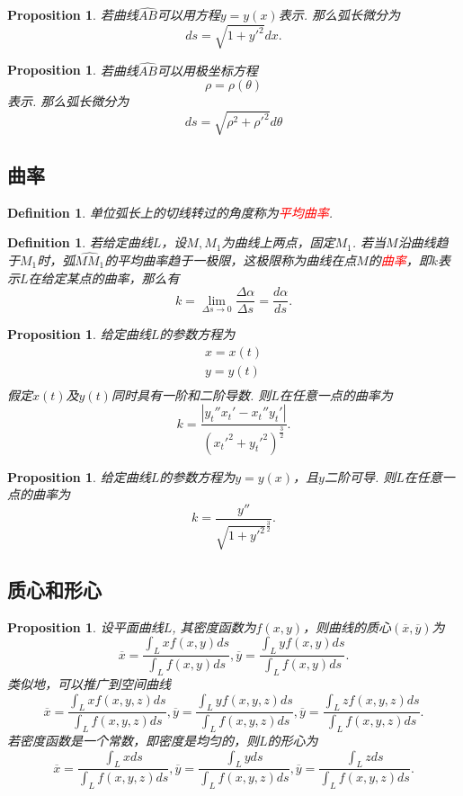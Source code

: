 \documentclass{article}
\newtheorem{proposition}[theorem]{Proposition}
\newtheorem{definition}[theorem]{Definition}
\newcommand{\redt}[1]{\textcolor{red}{#1}}
\begin{document}
\begin{proposition}
\rm  若曲线$\widehat{AB}$可以用方程$y=y(x)$表示. 那么弧长微分为
$$
ds = \sqrt{1+y'^2} dx. 
$$
\end{proposition}

\begin{proposition}
\rm 若曲线$\widehat{AB}$可以用极坐标方程
$$
\rho = \rho(\theta)
$$
表示. 那么弧长微分为
$$
ds = \sqrt{\rho^2+\rho'^2}d\theta
$$
\end{proposition}

\subsection{曲率}

\begin{definition}
\rm 单位弧长上的切线转过的角度称为\redt{平均曲率}. 
\end{definition}

\begin{definition}
\rm 若给定曲线$L$，设$M,M_1$为曲线上两点，固定$M_1$. 若当$M$沿曲线趋于$M_1$时，弧$\widehat{MM_1}$的平均曲率趋于一极限，这极限称为曲线在点$M$的\redt{曲率}，即$k$表示$L$在给定某点的曲率，那么有
$$
k =  \lim\limits_{\Delta s \to 0} \frac{\Delta \alpha}{\Delta s} = \frac{d\alpha}{ds}.
$$ 
\end{definition}

\begin{proposition}
\rm 给定曲线$L$的参数方程为
$$
\begin{array}{ll}
x = x(t) \\
y = y(t) \\
\end{array}
$$
假定$x(t)$及$y(t)$同时具有一阶和二阶导数. 则$L$在任意一点的曲率为
$$
k = \frac{|y_t''x_t'-x_t''y_t'|}{(x_t'^2 + y_t'^2)^{\frac{3}{2}}}.
$$
\end{proposition}

\begin{proposition}
\rm 给定曲线$L$的参数方程为$y=y(x)$，且$y$二阶可导. 则$L$在任意一点的曲率为
$$
k = \frac{y''}{\sqrt{1+y'^2}^{\frac{3}{2}}}.
$$
\end{proposition}


\subsection{质心和形心}

\begin{proposition}
\rm 设平面曲线$L$, 其密度函数为$f(x,y)$，则曲线的质心$(\overline{x},\overline{y})$为
$$
\overline{x} = \frac{\int_L xf(x,y)ds}{\int_L f(x,y)ds}, \overline{y} = \frac{\int_L yf(x,y)ds}{\int_L f(x,y)ds}.
$$
类似地，可以推广到空间曲线
$$
\overline{x} = \frac{\int_L xf(x,y,z)ds}{\int_L f(x,y,z)ds}, \overline{y} = \frac{\int_L yf(x,y,z)ds}{\int_L f(x,y,z)ds},
\overline{y} = \frac{\int_L zf(x,y,z)ds}{\int_L f(x,y,z)ds}.
$$
若密度函数是一个常数，即密度是均匀的，则$L$的形心为
$$
\overline{x} = \frac{\int_L xds}{\int_L f(x,y,z)ds}, \overline{y} = \frac{\int_L yds}{\int_L f(x,y,z)ds},
\overline{y} = \frac{\int_L zds}{\int_L f(x,y,z)ds}.
$$
\end{proposition}
\end{document}
